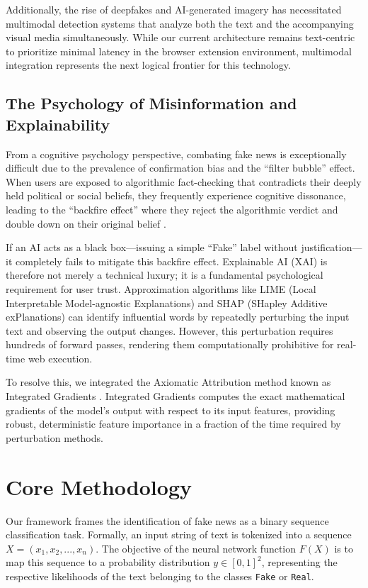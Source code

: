 \documentclass[conference]{IEEEtran}
\begin{document}
Additionally, the rise of deepfakes and AI-generated imagery has necessitated multimodal detection systems that analyze both the text and the accompanying visual media simultaneously. While our current architecture remains text-centric to prioritize minimal latency in the browser extension environment, multimodal integration represents the next logical frontier for this technology.

\subsection{The Psychology of Misinformation and Explainability}
From a cognitive psychology perspective, combating fake news is exceptionally difficult due to the prevalence of confirmation bias and the ``filter bubble'' effect. When users are exposed to algorithmic fact-checking that contradicts their deeply held political or social beliefs, they frequently experience cognitive dissonance, leading to the ``backfire effect'' where they reject the algorithmic verdict and double down on their original belief \cite{b14}.

If an AI acts as a black box—issuing a simple ``Fake'' label without justification—it completely fails to mitigate this backfire effect. Explainable AI (XAI) is therefore not merely a technical luxury; it is a fundamental psychological requirement for user trust. Approximation algorithms like LIME (Local Interpretable Model-agnostic Explanations) and SHAP (SHapley Additive exPlanations) can identify influential words by repeatedly perturbing the input text and observing the output changes. However, this perturbation requires hundreds of forward passes, rendering them computationally prohibitive for real-time web execution. 

To resolve this, we integrated the Axiomatic Attribution method known as Integrated Gradients \cite{b7}. Integrated Gradients computes the exact mathematical gradients of the model's output with respect to its input features, providing robust, deterministic feature importance in a fraction of the time required by perturbation methods.

\section{Core Methodology}

Our framework frames the identification of fake news as a binary sequence classification task. Formally, an input string of text is tokenized into a sequence $X = (x_1, x_2, ..., x_n)$. The objective of the neural network function $F(X)$ is to map this sequence to a probability distribution $y \in [0, 1]^2$, representing the respective likelihoods of the text belonging to the classes \texttt{Fake} or \texttt{Real}.
\end{document}
